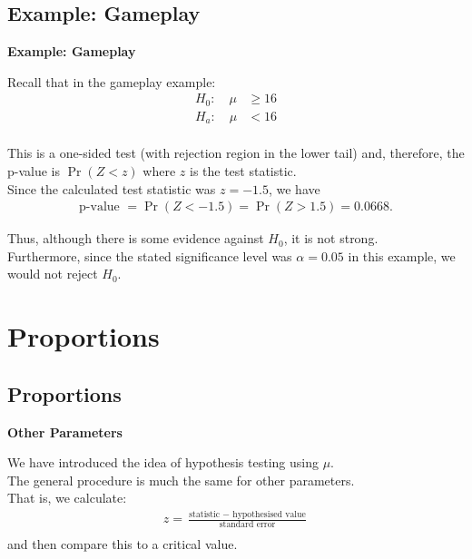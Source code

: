 \documentclass[compress]{beamer}        %
\makeatletter
\newcommand{\tcb}{\textcolor{beamer@blendedblue}}
\makeatother
\begin{document}
\subsection{Example: Gameplay}
\begin{frame}{\bf \tcb{Example: Gameplay}}

Recall that in the gameplay example:
\begin{align*}
H_0: \quad \mu &\ge 16\\[0.2cm]
H_a: \quad \mu &< 16\\[-0.5cm]
\end{align*}

This is a one-sided test (with rejection region in the lower tail) and, therefore, the p-value is $\Pr(Z < z)$ where $z$ is the test statistic.\\[0.4cm]

Since the calculated test statistic was $z=-1.5$, we have
\begin{align*}
\text{p-value } = \Pr(Z < -1.5) = \Pr(Z > 1.5) = 0.0668.
\end{align*}

Thus, although there is some evidence against $H_0$, it is not strong.\\[0.4cm] Furthermore,  since the stated significance level was $\alpha = 0.05$ in this example, we would not reject $H_0$.

\end{frame}





\section{Proportions}
\subsection{Proportions}
\begin{frame}{\bf \tcb{Other Parameters}}


We have introduced the idea of hypothesis testing using $\mu$.\\[0.8cm]

The general procedure is much the same for other parameters.\\[0.8cm]

That is, we calculate:\\
\begin{align*}
z = \frac{\text{statistic }-\text{ hypothesised value}}{\text{standard error}}\\
\end{align*}
and then compare this to a critical value.


\end{frame}
\end{document}
